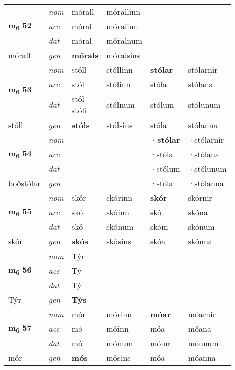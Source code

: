 \begin{longtable}[l]{X>{\footnotesize\itshape}XXXXX}
\multirow{3}{*}{{{\textbf{m{\textsubscript{6}}} \Large{\textbf{52}}}}}  
 & nom & mórall & mórallinn    & \textbf{} &   \\*
 & acc & móral  & móralinn   &   &  \\*
 & dat & móral & móralnum   &  &  \\*
 {\footnotesize{mórall}} &  gen & \textbf{mórals}  & móralsins  &  &  \\
\cmidrule{1-6}


\multirow{3}{*}{{{\textbf{m{\textsubscript{6}}} \Large{\textbf{53}}}}}  
 & nom & stóll & stóllinn    & \textbf{stólar} & stólarnir  \\*
 & acc & stól  & stólinn   & stóla  & stólana \\*
 & dat & \specialcell{stól\\ stóli} & stólnum   & stólum & stólunum \\*
 {\footnotesize{stóll}} &  gen & \textbf{stóls}  & stólsins  & stóla & stólanna \\
\cmidrule{1-6}


\multirow{3}{*}{{{\textbf{m{\textsubscript{6}}} \Large{\textbf{54}}}}}  
 & nom &  &     & \textbf{·stólar} & ·stólarnir  \\*
 & acc &   &    & ·stóla  & ·stólana \\*
 & dat &  &    & ·stólum & ·stólunum \\*
 {\footnotesize{boðstólar}} &  gen & \textbf{}  &   & ·stóla & ·stólanna \\
\cmidrule{1-6}


\multirow{3}{*}{{{\textbf{m{\textsubscript{6}}} \Large{\textbf{55}}}}}  
 & nom & skór & skórinn    & \textbf{skór} & skórnir  \\*
 & acc & skó  & skóinn   & skó  & skóna \\*
 & dat & skó & skónum   & skóm & skónum \\*
 {\footnotesize{skór}} &  gen & \textbf{skós}  & skósins  & skóa & skónna \\
\cmidrule{1-6}


\multirow{3}{*}{{{\textbf{m{\textsubscript{6}}} \Large{\textbf{56}}}}}  
 & nom & Týr &     & \textbf{} &   \\*
 & acc & Tý  &    &   &  \\*
 & dat & Tý &    &  &  \\*
 {\footnotesize{Týr}} &  gen & \textbf{Týs}  &   &  &  \\
\cmidrule{1-6}


\multirow{3}{*}{{{\textbf{m{\textsubscript{6}}} \Large{\textbf{57}}}}}  
 & nom & mór & mórinn    & \textbf{móar} & móarnir  \\*
 & acc & mó  & móinn   & móa  & móana \\*
 & dat & mó & mónum   & móum & móunum \\*
 {\footnotesize{mór}} &  gen & \textbf{mós}  & mósins  & móa & móanna \\
\cmidrule{1-6}



\end{longtable}
